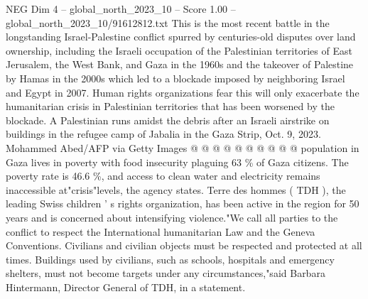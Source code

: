 \begin{textsample}{NEG Dim 4 – global\_north\_2023\_10 – Score 1.00 – global\_north\_2023\_10/91612812.txt}
This is the most recent battle in the longstanding Israel-Palestine conflict spurred by centuries-old disputes over land ownership, including the Israeli occupation of the Palestinian territories of East Jerusalem, the West Bank, and Gaza in the 1960s and the takeover of Palestine by Hamas in the 2000s which led to a blockade imposed by neighboring Israel and Egypt in 2007.
Human rights organizations fear this will only exacerbate the humanitarian crisis in Palestinian territories that has been worsened by the blockade.
A Palestinian runs amidst the debris after an Israeli airstrike on buildings in the refugee camp of Jabalia in the Gaza Strip, Oct. 9, 2023.
Mohammed Abed/AFP via Getty Images @ @ @ @ @ @ @ @ @ @ population in Gaza lives in poverty with food insecurity plaguing 63 \% of Gaza citizens.
The poverty rate is 46.6 \%, and access to clean water and electricity remains inaccessible at"crisis"levels, the agency states.
Terre des hommes ( TDH ), the leading Swiss children ' s rights organization, has been active in the region for 50 years and is concerned about intensifying violence."We call all parties to the conflict to respect the International humanitarian Law and the Geneva Conventions.
Civilians and civilian objects must be respected and protected at all times.
Buildings used by civilians, such as schools, hospitals and emergency shelters, must not become targets under any circumstances,"said Barbara Hintermann, Director General of TDH, in a statement.

\end{textsample}
